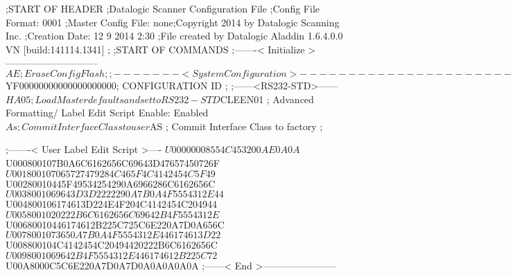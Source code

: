 ;START OF HEADER
;Datalogic Scanner Configuration File
;Config File Format: 0001
;Master Config File: none;Copyright 2014 by Datalogic Scanning Inc.
;Creation Date: 12 9 2014 2:30
;File created by Datalogic Aladdin 1.6.4.0.0 VN [build:141114.1341]
;
;START OF COMMANDS
;-------< Initialize >-----------------------------
$AE                 ; Erase Config Flash
;
;-------< System Configuration >-------------------------------
$YF00000000000000000000; CONFIGURATION ID
;
;------<RS232-STD>------
$HA05               ; Load Master defaults and set to RS232-STD
$CLEEN01            ; Advanced Formatting/ Label Edit Script Enable: Enabled
$As                 ; Commit Interface Class to user
$AS                 ; Commit Interface Class to factory
;

;-------< User Label Edit Script >----
$U00000008554C453200AE0A0A
$U000800107B0A6C6162656C69643D47657450726F
$U001800107065727479284C465F4C4142454C5F49
$U00280010445F49534254290A6966286C6162656C
$U0038001069643D3D2222290A7B0A4F5554312E44
$U004800106174613D224E4F204C4142454C204944
$U0058001020222B6C6162656C69642B4F5554312E
$U00680010446174612B225C725C6E220A7D0A656C
$U0078001073650A7B0A4F5554312E446174613D22
$U008800104C4142454C20494420222B6C6162656C
$U0098001069642B4F5554312E446174612B225C72
$U00A8000C5C6E220A7D0A7D0A0A0A0A0A
;------< End >-----------------------
